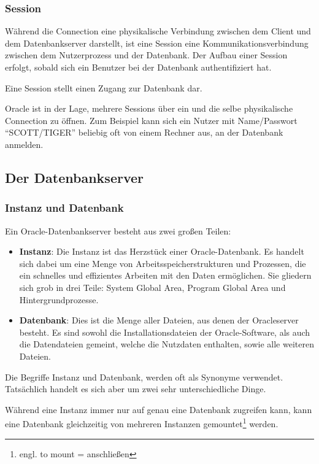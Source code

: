         \subsubsection{Session}
          W\"ahrend die Connection eine physikalische Verbindung zwischen dem Client und dem Datenbankserver darstellt, ist eine Session eine Kommunikationsverbindung zwischen dem Nutzerprozess und der Datenbank. Der Aufbau einer Session erfolgt, sobald sich ein Benutzer bei der Datenbank authentifiziert hat.

          \begin{merke}
            Eine Session stellt einen Zugang zur Datenbank dar.
          \end{merke}

          Oracle ist in der Lage, mehrere Sessions \"uber ein und die selbe physikalische Connection zu \"offnen. Zum Beispiel kann sich ein Nutzer mit Name/Passwort \enquote{SCOTT/TIGER} beliebig oft von einem Rechner aus, an der Datenbank anmelden.


      \subsection{Der Datenbankserver}
        \subsubsection{Instanz und Datenbank}
          Ein Oracle-Datenbankserver besteht aus zwei gro\ss{}en Teilen:
          \begin{itemize}
            \item \textbf{Instanz}: Die Instanz ist das Herzst\"uck einer Oracle-Datenbank. Es handelt sich dabei um eine Menge von Arbeitsspeicherstrukturen und Prozessen, die ein schnelles und effizientes Arbeiten mit den Daten erm\"oglichen. Sie gliedern sich grob in drei Teile: System Global Area, Program Global Area und Hintergrundprozesse.
            \item \textbf{Datenbank}: Dies ist die Menge aller Dateien, aus denen der Oracleserver besteht. Es sind sowohl die Installationsdateien der Oracle-Software, als auch die Datendateien gemeint, welche die Nutzdaten enthalten, sowie alle weiteren Dateien.
          \end{itemize}

          \begin{merke}
            Die Begriffe Instanz und Datenbank, werden oft als Synonyme verwendet. Tats\"achlich handelt es sich aber um zwei sehr unterschiedliche Dinge.
          \end{merke}
          W\"ahrend eine Instanz immer nur auf genau eine Datenbank zugreifen kann, kann eine Datenbank gleichzeitig von mehreren Instanzen gemountet\footnote{engl. to mount = anschlie\ss{}en} werden.

